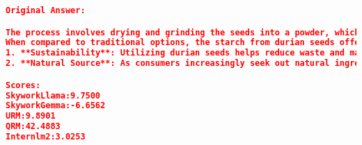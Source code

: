 \begin{lstlisting}[language=json,numbers=none]
Original Answer:

The process involves drying and grinding the seeds into a powder, which can then be added to food to improve texture and stability.
When compared to traditional options, the starch from durian seeds offers several potential benefits:
1. **Sustainability**: Utilizing durian seeds helps reduce waste and makes use of a byproduct that would otherwise be discarded. This promotes a more sustainable and circular approach to food production.
2. **Natural Source**: As consumers increasingly seek out natural ingredients, plant-based stabilizers like durian seed

Scores:
SkyworkLlama:9.7500
SkyworkGemma:-6.6562
URM:9.8901
QRM:42.4883
Internlm2:3.0253
\end{lstlisting}